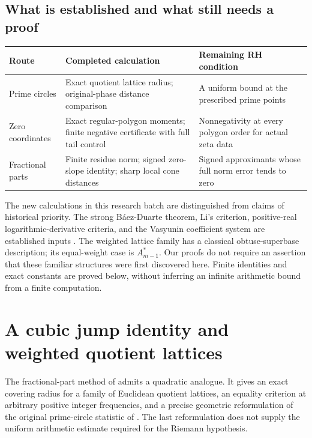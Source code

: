 \documentclass[11pt,a4paper]{article}
\theoremstyle{definition}\newtheorem{definition}[theorem]{Definition}
\theoremstyle{remark}\newtheorem{remark}[theorem]{Remark}
\numberwithin{equation}{section}
\begin{document}
\subsection{What is established and what still needs a proof}

\begin{center}
\renewcommand{\arraystretch}{1.22}
\begin{tabular}{@{}p{}p{}p{}@{}}
\toprule
Route & Completed calculation & Remaining RH condition\\
\midrule
Prime circles & Exact quotient lattice radius; original-phase distance
comparison & A uniform bound at the prescribed prime points\\
Zero coordinates & Exact regular-polygon moments; finite negative
certificate with full tail control & Nonnegativity at every polygon
order for actual zeta data\\
Fractional parts & Finite residue norm; signed zero-slope identity;
sharp local cone distances & Signed approximants whose full norm
error tends to zero\\
\bottomrule
\end{tabular}
\end{center}

The new calculations in this research batch are distinguished from
claims of historical priority. The strong B\'aez-Duarte theorem, Li's
criterion, positive-real logarithmic-derivative criteria, and the
Vasyunin coefficient system are established inputs
\cite{BaezDuarte,Li,Lagarias,Balazard}. The weighted lattice family has
a classical obtuse-superbase description; its equal-weight case is
$A_{m-1}^*$. Our proofs do not require an assertion that these familiar
structures were first discovered here. Finite identities and exact
constants are proved below, without inferring an infinite arithmetic
bound from a finite computation.


\section{A cubic jump identity and weighted quotient lattices}
\label{r4c:section}

The fractional-part method of \cite{VMRC200} admits a quadratic analogue.
It gives an exact covering radius for a family of Euclidean quotient
lattices, an equality criterion at arbitrary positive integer frequencies,
and a precise geometric reformulation of the original prime-circle
statistic of \cite{PrimeCircles}.  The last reformulation does not supply
the uniform arithmetic estimate required for the Riemann hypothesis.
\end{document}
